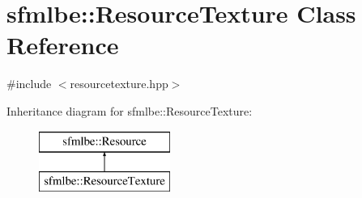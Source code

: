 \hypertarget{classsfmlbe_1_1_resource_texture}{}\section{sfmlbe\+:\+:Resource\+Texture Class Reference}
\label{classsfmlbe_1_1_resource_texture}


{\ttfamily \#include $<$resourcetexture.\+hpp$>$}

Inheritance diagram for sfmlbe\+:\+:Resource\+Texture\+:\begin{figure}[H]
\begin{center}
\leavevmode
\includegraphics[height=2.000000cm]{classsfmlbe_1_1_resource_texture}
\end{center}
\end{figure}
